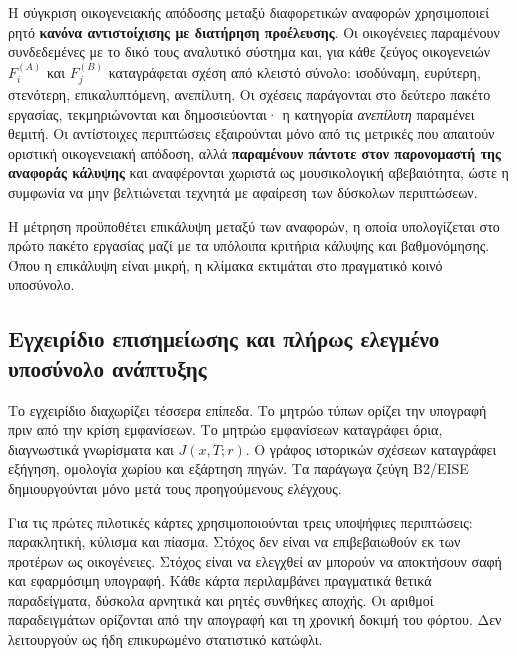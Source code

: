 \documentclass[11pt,a4paper]{article}
\begin{document}
Η σύγκριση οικογενειακής απόδοσης μεταξύ διαφορετικών αναφορών χρησιμοποιεί ρητό \textbf{κανόνα αντιστοίχισης με διατήρηση προέλευσης}. Οι οικογένειες παραμένουν συνδεδεμένες με το δικό τους αναλυτικό σύστημα και, για κάθε ζεύγος οικογενειών \(F_i^{(A)}\) και \(F_j^{(B)}\) καταγράφεται σχέση από κλειστό σύνολο: ισοδύναμη, ευρύτερη, στενότερη, επικαλυπτόμενη, ανεπίλυτη. Οι σχέσεις παράγονται στο δεύτερο πακέτο εργασίας, τεκμηριώνονται και δημοσιεύονται· η κατηγορία \emph{ανεπίλυτη} παραμένει θεμιτή. Οι αντίστοιχες περιπτώσεις εξαιρούνται μόνο από τις μετρικές που απαιτούν οριστική οικογενειακή απόδοση, αλλά \textbf{παραμένουν πάντοτε στον παρονομαστή της αναφοράς κάλυψης} και αναφέρονται χωριστά ως μουσικολογική αβεβαιότητα, ώστε η συμφωνία να μην βελτιώνεται τεχνητά με αφαίρεση των δύσκολων περιπτώσεων.

Η μέτρηση προϋποθέτει επικάλυψη μεταξύ των αναφορών, η οποία υπολογίζεται στο πρώτο πακέτο εργασίας μαζί με τα υπόλοιπα κριτήρια κάλυψης και βαθμονόμησης. Όπου η επικάλυψη είναι μικρή, η κλίμακα εκτιμάται στο πραγματικό κοινό υποσύνολο.

\subsection{Εγχειρίδιο επισημείωσης και πλήρως ελεγμένο υποσύνολο ανάπτυξης}\label{app:corpora-annotation-pilot}

Το εγχειρίδιο διαχωρίζει τέσσερα επίπεδα. Το μητρώο τύπων ορίζει την υπογραφή πριν από την κρίση εμφανίσεων. Το μητρώο εμφανίσεων καταγράφει όρια, διαγνωστικά γνωρίσματα και $J(x,T;r)$. Ο γράφος ιστορικών σχέσεων καταγράφει εξήγηση, ομολογία χωρίου και εξάρτηση πηγών. Τα παράγωγα ζεύγη B2/EISE δημιουργούνται μόνο μετά τους προηγούμενους ελέγχους.

Για τις πρώτες πιλοτικές κάρτες χρησιμοποιούνται τρεις υποψήφιες περιπτώσεις: παρακλητική, κύλισμα και πίασμα. Στόχος δεν είναι να επιβεβαιωθούν εκ των προτέρων ως οικογένειες. Στόχος είναι να ελεγχθεί αν μπορούν να αποκτήσουν σαφή και εφαρμόσιμη υπογραφή. Κάθε κάρτα περιλαμβάνει πραγματικά θετικά παραδείγματα, δύσκολα αρνητικά και ρητές συνθήκες αποχής. Οι αριθμοί παραδειγμάτων ορίζονται από την απογραφή και τη χρονική δοκιμή του φόρτου. Δεν λειτουργούν ως ήδη επικυρωμένο στατιστικό κατώφλι.
\end{document}
